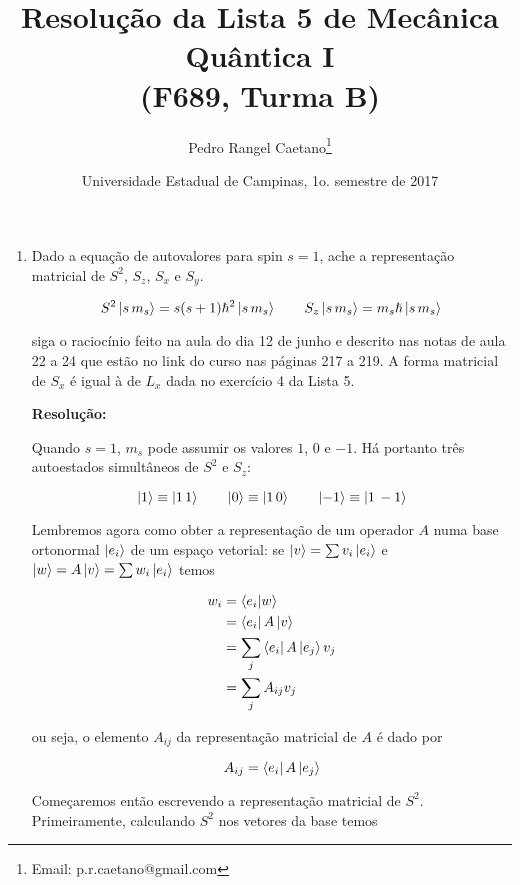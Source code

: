 \documentclass[a4paper, 12pt, notitlepage]{article}
\begin{document}
\title{Resolução da Lista 5 de Mecânica Quântica I\\ (F689, Turma B)}
\author{Pedro Rangel Caetano\footnote{Email: p.r.caetano@gmail.com}} 
\date{Universidade Estadual de Campinas, 1o. semestre de 2017}
\maketitle

\tableofcontents
\pagebreak


\begin{enumerate}
\item Dado a equação de autovalores para spin $s=1$, ache a representação matricial de $S^2$, $S_z$, $S_x$ e $S_y$.

\begin{equation}
S^2 \ket{s\,m_s} = s(s+1)\hslash^2\ket{s\,m_s} \qquad
S_z \ket{s\,m_s} = m_s \hslash \ket{s\,m_s}
\end{equation}

\noindent siga o raciocínio feito na aula do dia 12 de junho e descrito nas notas de aula 22 a 24 que estão no link do curso nas páginas 217 a 219. A forma matricial de $S_x$ é igual à de $L_x$ dada no exercício 4 da Lista 5.

\textbf{Resolução: }

Quando $s = 1$, $m_s$ pode assumir os valores $1$, $0$ e $-1$. Há portanto três autoestados simultâneos de $S^2$ e $S_z$:

\[
  \ket{1} \equiv \ket{1\,1} \qquad
  \ket{0} \equiv \ket{1\,0} \qquad
  \ket{-1} \equiv \ket{1\,-1}
\]

Lembremos agora como obter a representação de um operador $A$ numa base ortonormal $\ket{e_i}$ de um espaço vetorial: se $\ket{v} = \sum v_i \ket{e_i}$ e $\ket{w} = A\ket{v} = \sum w_i \ket{e_i}$ temos

\begin{align*}
  w_i &= \left\langle e_i | w\right\rangle \\
  &= \bra{e_i} A \ket{v} \\
  &= \sum_j \bra{e_i} A \ket{e_j} v_j \\
  &= \sum_j A_{ij} v_j
\end{align*}

\noindent ou seja, o elemento $A_{ij}$ da representação matricial de $A$ é dado por

\[ A_{ij} = \bra{e_i} A \ket{e_j} \]

Começaremos então escrevendo a representação matricial de $S^2$. Primeiramente, calculando $S^2$ nos vetores da base temos


\end{enumerate}
\end{document}
